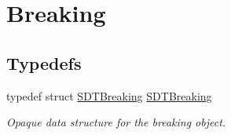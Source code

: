 \hypertarget{group__breaking}{}\section{Breaking}
\label{group__breaking}
\subsection*{Typedefs}
\begin{DoxyCompactItemize}
\item 
\hypertarget{group__breaking_gaf66ba3e9569d061a0d6337a24bce1dc5}{}typedef struct \hyperlink{group__breaking_gaf66ba3e9569d061a0d6337a24bce1dc5}{S\+D\+T\+Breaking} \hyperlink{group__breaking_gaf66ba3e9569d061a0d6337a24bce1dc5}{S\+D\+T\+Breaking}\label{group__breaking_gaf66ba3e9569d061a0d6337a24bce1dc5}

\begin{DoxyCompactList}\small\item\em Opaque data structure for the breaking object. \end{DoxyCompactList}\end{DoxyCompactItemize}
